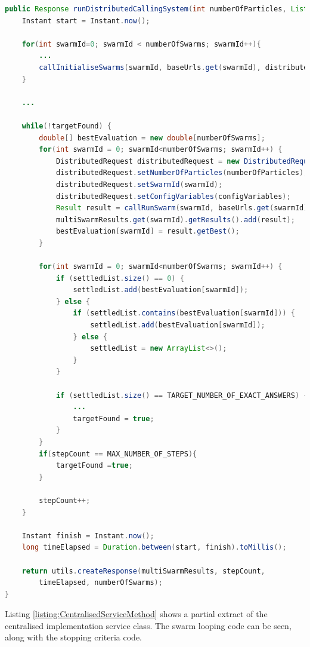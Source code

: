 \documentclass[oneside,12pt]{book}
\begin{document}
\begin{lstlisting}[basicstyle=\footnotesize, language=Java]
public Response runDistributedCallingSystem(int numberOfParticles, List<String> baseUrls, ConfigVariables configVariables) {
    Instant start = Instant.now();

    for(int swarmId=0; swarmId < numberOfSwarms; swarmId++){
        ...
        callInitialiseSwarms(swarmId, baseUrls.get(swarmId), distributedRequest);
    }

    ...

    while(!targetFound) {
        double[] bestEvaluation = new double[numberOfSwarms];
        for(int swarmId = 0; swarmId<numberOfSwarms; swarmId++) {
            DistributedRequest distributedRequest = new DistributedRequest();
            distributedRequest.setNumberOfParticles(numberOfParticles);
            distributedRequest.setSwarmId(swarmId);
            distributedRequest.setConfigVariables(configVariables);
            Result result = callRunSwarm(swarmId, baseUrls.get(swarmId) ,distributedRequest);
            multiSwarmResults.get(swarmId).getResults().add(result);
            bestEvaluation[swarmId] = result.getBest();
        }

        for(int swarmId = 0; swarmId<numberOfSwarms; swarmId++) {
            if (settledList.size() == 0) {
                settledList.add(bestEvaluation[swarmId]);
            } else {
                if (settledList.contains(bestEvaluation[swarmId])) {
                    settledList.add(bestEvaluation[swarmId]);
                } else {
                    settledList = new ArrayList<>();
                }
            }

            if (settledList.size() == TARGET_NUMBER_OF_EXACT_ANSWERS) {
                ...
                targetFound = true;
            }
        }
        if(stepCount == MAX_NUMBER_OF_STEPS){
            targetFound =true;
        }

        stepCount++;
    }

    Instant finish = Instant.now();
    long timeElapsed = Duration.between(start, finish).toMillis();

    return utils.createResponse(multiSwarmResults, stepCount, 
        timeElapsed, numberOfSwarms);
}
\end{lstlisting}
\label{listing:DistributedService}

Listing \ref{listing:CentralisedServiceMethod} shows a partial extract of the centralised implementation service class. The swarm looping code can be seen, along with the stopping criteria code.
\end{document}
